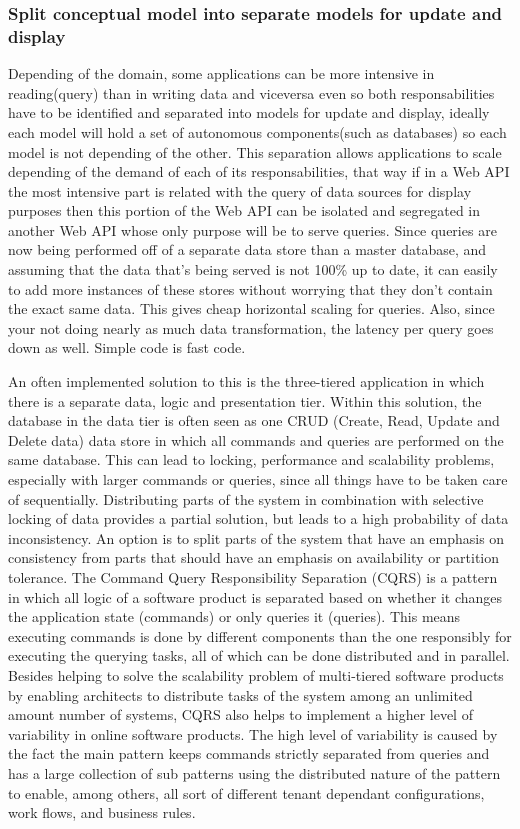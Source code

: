 \documentclass[10pt,article]{IEEEtran}
\begin{document}
\subsubsection{Split conceptual model into separate models for update and display}
Depending of the domain, some applications can be more intensive in reading(query) than in writing data and viceversa even so both responsabilities have to be identified and separated into models for update and display, ideally each model will hold a set of autonomous components(such as databases) so each model is not depending of the other. This separation allows applications to scale depending of the demand of each of its responsabilities, that way if in a Web API the most intensive part is related with the query of data sources for display purposes then this portion of the Web API can be isolated and segregated in another Web API whose only purpose will be to serve queries. Since queries are now being performed off of a separate data store than a master database,  and assuming that the data that's being served is not 100\% up to date, it can easily to add more instances of these stores without worrying that they don’t contain the exact same data. This gives cheap horizontal scaling for queries. Also, since your not doing nearly as much data transformation, the latency per query goes down as well. Simple code is fast code\cite{dahan:cqrs}.

An often implemented solution to this is the three-tiered application in which there is a separate data, logic and presentation tier. Within this solution, the database in the data tier is often seen as one CRUD (Create, Read, Update and Delete data) data store in which all commands
and queries are performed on the same database. This can lead to locking, performance and scalability problems, especially with larger commands or queries, since all things have to be taken care of sequentially. Distributing parts of the system in combination with selective locking of data provides a partial solution, but leads to a high probability of data inconsistency.
An option is to split parts of the system that have an emphasis on consistency from parts that should have an emphasis on availability or partition tolerance. The Command Query Responsibility Separation (CQRS) is a pattern in which all logic of a software product is separated based on whether it changes the application state (commands) or only queries it (queries). This means executing commands is done by different components than the one responsibly for executing the querying tasks, all of which can be done distributed and in parallel.
Besides helping to solve the scalability problem of multi-tiered software products by enabling architects to distribute tasks of the system among an unlimited amount number of systems, CQRS also helps to implement a higher level of variability in online software products. The high level of variability is caused by the fact the main pattern keeps commands strictly separated from queries and has a large collection of sub patterns using the distributed nature of the pattern to enable, among others, all sort of different tenant dependant configurations, work flows, and business rules\cite{cqrs:kabbedijk}.
\end{document}
